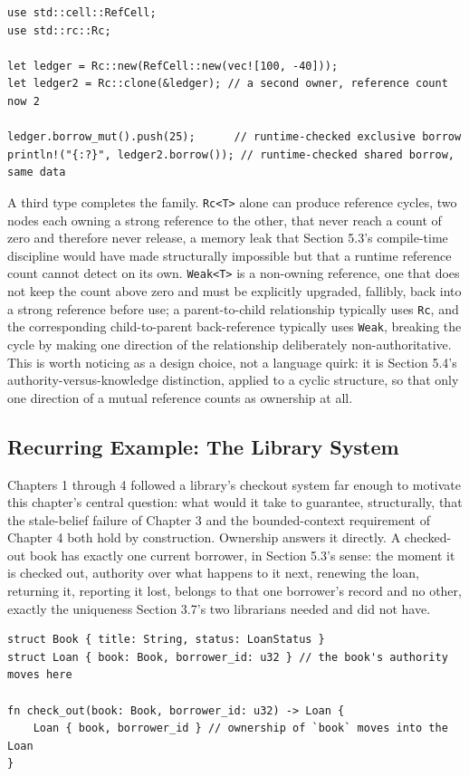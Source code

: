 \documentclass[11pt]{book}
\begin{document}
\begin{lstlisting}
use std::cell::RefCell;
use std::rc::Rc;

let ledger = Rc::new(RefCell::new(vec![100, -40]));
let ledger2 = Rc::clone(&ledger); // a second owner, reference count now 2

ledger.borrow_mut().push(25);      // runtime-checked exclusive borrow
println!("{:?}", ledger2.borrow()); // runtime-checked shared borrow, same data
\end{lstlisting}

A third type completes the family. \texttt{Rc<T>} alone can produce reference cycles, two nodes each owning a strong reference to the other, that never reach a count of zero and therefore never release, a memory leak that Section 5.3's compile-time discipline would have made structurally impossible but that a runtime reference count cannot detect on its own. \texttt{Weak<T>} is a non-owning reference, one that does not keep the count above zero and must be explicitly upgraded, fallibly, back into a strong reference before use; a parent-to-child relationship typically uses \texttt{Rc}, and the corresponding child-to-parent back-reference typically uses \texttt{Weak}, breaking the cycle by making one direction of the relationship deliberately non-authoritative. This is worth noticing as a design choice, not a language quirk: it is Section 5.4's authority-versus-knowledge distinction, applied to a cyclic structure, so that only one direction of a mutual reference counts as ownership at all.

\subsection*{Recurring Example: The Library System}

Chapters 1 through 4 followed a library's checkout system far enough to motivate this chapter's central question: what would it take to guarantee, structurally, that the stale-belief failure of Chapter 3 and the bounded-context requirement of Chapter 4 both hold by construction. Ownership answers it directly. A checked-out book has exactly one current borrower, in Section 5.3's sense: the moment it is checked out, authority over what happens to it next, renewing the loan, returning it, reporting it lost, belongs to that one borrower's record and no other, exactly the uniqueness Section 3.7's two librarians needed and did not have.

\begin{lstlisting}
struct Book { title: String, status: LoanStatus }
struct Loan { book: Book, borrower_id: u32 } // the book's authority moves here

fn check_out(book: Book, borrower_id: u32) -> Loan {
    Loan { book, borrower_id } // ownership of `book` moves into the Loan
}
\end{lstlisting}
\end{document}
